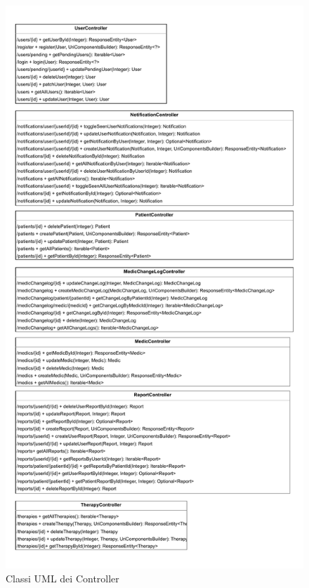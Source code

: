 \documentclass[a4paper]{article}
\begin{document}
\begin{figure}[H]
  \begin{center}
    \includegraphics[width=1\textwidth]{uml.pdf}
  \end{center}
  \caption{Classi UML dei Controller} 
  \label{fig:controller}
\end{figure}
\noindent
\end{document}
